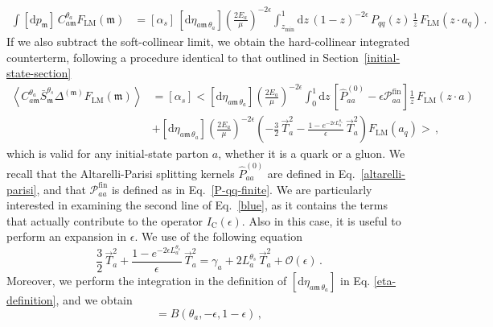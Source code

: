 \documentclass[a4paper, 12pt]{book}
\newcommand{\um}{\mathfrak{m}}
\begin{document}
\begin{equation}
  \begin{aligned}
  \int [\mathrm{d}p_\um]\, C_{a\um}^{\theta_a}  F_{\mathrm{LM}} (\um) &= [\alpha_s]\,  [\mathrm{d}\eta_{a\um \, \theta_a}] \left(\frac{2E_a}{\mu}\right)^{-2\epsilon} \int_{z_{\mathrm{min}}}^{1} \mathrm{d}z \, (1-z)^{-2\epsilon} \, P_{qq}(z) \, \frac{1}{z} \, F_{\mathrm{LM}}(z\cdot a_q ) \, .
  \end{aligned}
\end{equation}
If we also subtract the soft-collinear limit, we obtain the hard-collinear integrated counterterm, following a procedure identical to that outlined in Section~\ref{initial-state-section}
\begin{equation}
  \begin{aligned}
    \left< C_{a\um}^{\theta_a} \bar{S}_\um^{\theta_s} \Delta^{(\um)} F_{\mathrm{LM}} (\um) \right>  &= [\alpha_s] \bigl< [\mathrm{d}\eta_{a\um \, \theta_a}] \left(\frac{2E_a}{\mu}\right)^{-2\epsilon} \int_{0}^{1} \mathrm{d}z \, \left[\hat{P}_{aa}^{(0)}-\epsilon \mathcal{P}_{aa}^{\mathrm{fin}}\right] \frac{1}{z} \, F_{\mathrm{LM}}(z\cdot a) \\
    & + [\mathrm{d}\eta_{a\um \, \theta_a}] \left(\frac{2E_a}{\mu}\right)^{-2\epsilon} \left(-\frac{3}{2} \, \vec{T}_a^2-\frac{1-e^{-2\epsilon L_a^{\theta_s}}}{\epsilon}\, \vec{T}_a^2 \right) F_{\mathrm{LM}}(a_q) \bigr> \, ,
    \label{blue}
  \end{aligned}
\end{equation}
which is valid for any initial-state parton $a$, whether it is a quark or a gluon. We recall that the Altarelli-Parisi splitting kernels $\hat{P}_{aa}^{(0)}$ are defined in Eq.~\ref{altarelli-parisi}, and that $\mathcal{P}_{aa}^{\mathrm{fin}}$ is defined as in Eq.~\ref{P-qq-finite}. We are particularly interested in examining the second line of Eq.~\ref{blue}, as it contains the terms that actually contribute to the operator $I_{\mathrm{C}}(\epsilon)$. Also in this case, it is useful to perform an expansion in $\epsilon$. We use of the following equation
\begin{equation}
  \frac{3}{2}\, \vec{T}_a^2+ \frac{1-e^{-2\epsilon L_a^{\theta_s}}}{\epsilon} \, \vec{T}_a^2  = \gamma_a + 2 L_a^{\theta_s} \,\vec{T}_a^2 + \mathcal{O} (\epsilon) \, .
\end{equation}
Moreover, we perform the integration in the definition of $[\mathrm{d}\eta_{a\um \, \theta_a}]$ in Eq. \ref{eta-definition}, and we obtain
\begin{equation}
  [\mathrm{d}\eta_{a\um \, \theta_a}] = B(\theta_a, -\epsilon, 1-\epsilon)\, ,
\end{equation}
\end{document}
